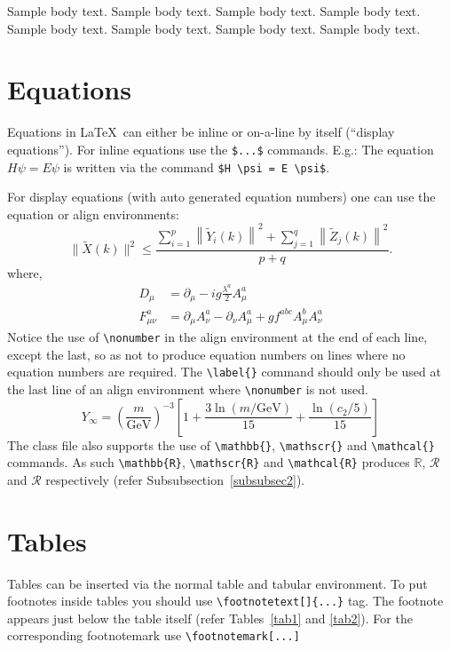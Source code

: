 \documentclass[
	a4paper, %
	10pt, %
	unnumberedsections, %
	twoside, %
]{LTJournalArticle}
\begin{document}
Sample body text. Sample body text. Sample body text. Sample body text. Sample body text. Sample body text. Sample body text. Sample body text. 

\section{Equations}\label{sec4}

Equations in \LaTeX\ can either be inline or on-a-line by itself (``display equations''). For
inline equations use the \verb+$...$+ commands. E.g.: The equation
$H\psi = E \psi$ is written via the command \verb+$H \psi = E \psi$+.

For display equations (with auto generated equation numbers)
one can use the equation or align environments:
\begin{equation}
\|\tilde{X}(k)\|^2 \leq\frac{\sum\limits_{i=1}^{p}\left\|\tilde{Y}_i(k)\right\|^2+\sum\limits_{j=1}^{q}\left\|\tilde{Z}_j(k)\right\|^2 }{p+q}.\label{eq1}
\end{equation}
where,
\begin{align}
D_\mu &=  \partial_\mu - ig \frac{\lambda^a}{2} A^a_\mu \nonumber \\
F^a_{\mu\nu} &= \partial_\mu A^a_\nu - \partial_\nu A^a_\mu + g f^{abc} A^b_\mu A^a_\nu \label{eq2}
\end{align}
Notice the use of \verb+\nonumber+ in the align environment at the end
of each line, except the last, so as not to produce equation numbers on
lines where no equation numbers are required. The \verb+\label{}+ command
should only be used at the last line of an align environment where
\verb+\nonumber+ is not used.
\begin{equation}
Y_\infty = \left( \frac{m}{\textrm{GeV}} \right)^{-3}
    \left[ 1 + \frac{3 \ln(m/\textrm{GeV})}{15}
    + \frac{\ln(c_2/5)}{15} \right]
\end{equation}
The class file also supports the use of \verb+\mathbb{}+, \verb+\mathscr{}+ and
\verb+\mathcal{}+ commands. As such \verb+\mathbb{R}+, \verb+\mathscr{R}+
and \verb+\mathcal{R}+ produces $\mathbb{R}$, $\mathscr{R}$ and $\mathcal{R}$
respectively (refer Subsubsection~\ref{subsubsec2}).

\section{Tables}\label{sec5}

Tables can be inserted via the normal table and tabular environment. To put
footnotes inside tables you should use \verb+\footnotetext[]{...}+ tag.
The footnote appears just below the table itself (refer Tables~\ref{tab1} and \ref{tab2}). 
For the corresponding footnotemark use \verb+\footnotemark[...]+
\end{document}
